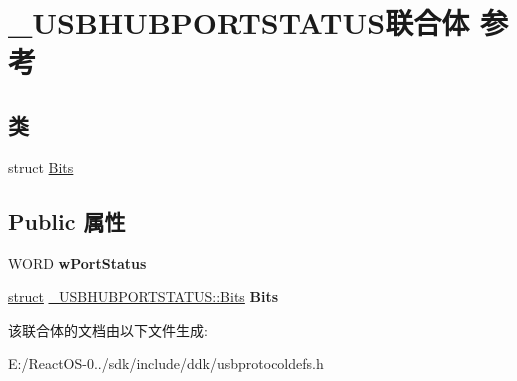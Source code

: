 \hypertarget{union___u_s_b_h_u_b_p_o_r_t_s_t_a_t_u_s}{}\section{\+\_\+\+U\+S\+B\+H\+U\+B\+P\+O\+R\+T\+S\+T\+A\+T\+U\+S联合体 参考}
\label{union___u_s_b_h_u_b_p_o_r_t_s_t_a_t_u_s}
\subsection*{类}
\begin{DoxyCompactItemize}
\item 
struct \hyperlink{struct___u_s_b_h_u_b_p_o_r_t_s_t_a_t_u_s_1_1_bits}{Bits}
\end{DoxyCompactItemize}
\subsection*{Public 属性}
\begin{DoxyCompactItemize}
\item 
\mbox{\label{union___u_s_b_h_u_b_p_o_r_t_s_t_a_t_u_s_a7c2236ffc65fc6311e8b3924e8e9d075}} 
W\+O\+RD {\bfseries w\+Port\+Status}
\item 
\mbox{\label{union___u_s_b_h_u_b_p_o_r_t_s_t_a_t_u_s_a4f9c17836103805eb652549321e2a9e3}} 
\hyperlink{interfacestruct}{struct} \hyperlink{struct___u_s_b_h_u_b_p_o_r_t_s_t_a_t_u_s_1_1_bits}{\+\_\+\+U\+S\+B\+H\+U\+B\+P\+O\+R\+T\+S\+T\+A\+T\+U\+S\+::\+Bits} {\bfseries Bits}
\end{DoxyCompactItemize}


该联合体的文档由以下文件生成\+:\begin{DoxyCompactItemize}
\item 
E\+:/\+React\+O\+S-\/0../sdk/include/ddk/usbprotocoldefs.\+h\end{DoxyCompactItemize}
